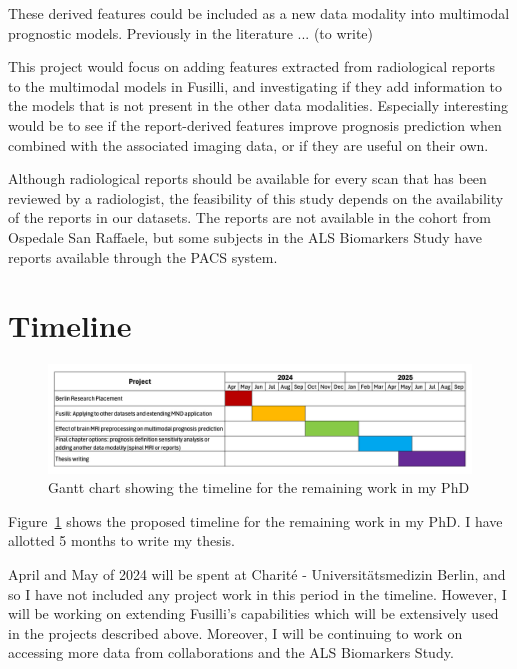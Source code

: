 These derived features could be included as a new data modality into multimodal prognostic models.
Previously in the literature ... (to write)

This project would focus on adding features extracted from radiological reports to the multimodal models in Fusilli, and investigating if they add information to the models that is not present in the other data modalities.
Especially interesting would be to see if the report-derived features improve prognosis prediction when combined with the associated imaging data, or if they are useful on their own.

Although radiological reports should be available for every scan that has been reviewed by a radiologist, the feasibility of this study depends on the availability of the reports in our datasets.
The reports are not available in the cohort from Ospedale San Raffaele, but some subjects in the ALS Biomarkers Study have reports available through the PACS system.

\section{Timeline}

\begin{figure}
    \centering
    \hspace*{-0.1\textwidth}
    \includegraphics[width=1.2\textwidth]{figures/gantt_chart}
    \caption{Gantt chart showing the timeline for the remaining work in my PhD}
    \label{fig:gantt_chart}
\end{figure}

Figure~\ref{fig:gantt_chart} shows the proposed timeline for the remaining work in my PhD.
I have allotted 5 months to write my thesis.

April and May of 2024 will be spent at Charité - Universitätsmedizin Berlin, and so I have not included any project work in this period in the timeline.
However, I will be working on extending Fusilli's capabilities which will be extensively used in the projects described above.
Moreover, I will be continuing to work on accessing more data from collaborations and the ALS Biomarkers Study.
